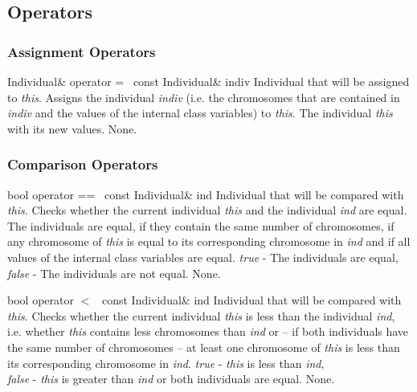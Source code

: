 \subsection{Operators}

\subsubsection{Assignment Operators}

\setNormalInstance
\printMethodWithOneParam
{Individual\&}
{operator =\ }
{const Individual\&}
{indiv}
{Individual that will be assigned to {\em this}.}
{Assigns the individual {\em indiv} (i.e. the chromosomes that
 are contained in {\em indiv} and the values of the internal
 class variables) to {\em this}.}
{The individual {\em this} with its new values.}
{None.}

\subsubsection{Comparison Operators}

\setConstInstance
\printMethodWithOneParam
{bool}
{operator ==\ }
{const Individual\&}
{ind}
{Individual that will be compared with {\em this}.}
{Checks whether the current individual {\em this} and the
 individual {\em ind} are equal. The individuals are equal,
 if they contain the same number of chromosomes, if any
 chromosome of {\em this} is equal to its corresponding
 chromosome in {\em ind} and if all values of the internal
 class variables are equal.}
{
 {\em true}  - The individuals are equal,\\
 {\em false} - The individuals are not equal.}
{None.}

\vspace*{4ex}

\setConstInstance
\printMethodWithOneParam
{bool}
{operator $<$\ }
{const Individual\&}
{ind}
{Individual that will be compared with {\em this}.}
{Checks whether the current individual {\em this} is less than
 the individual {\em ind}, i.e. whether {\em this}
 contains less chromosomes than {\em ind} or -- if both individuals
 have the same number of chromosomes -- at least one chromosome
 of {\em this} is less than its corresponding chromosome
 in {\em ind}.}
{
 {\em true}  - {\em this} is less than {\em ind},\\
 {\em false} - {\em this} is greater than {\em ind} or both individuals
 are equal.}
{None.}

